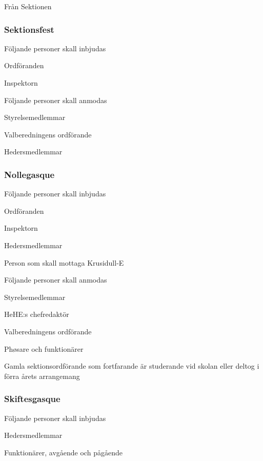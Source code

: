 \documentclass[10pt]{article}
\begin{document}
Från Sektionen

\subsubsection*{Sektionsfest}
Följande personer skall inbjudas
\begin{dashlist}
\item Ordföranden
\item Inspektorn
\end{dashlist}
Följande personer skall anmodas
\begin{dashlist}
\item Styrelsemedlemmar
\item Valberedningens ordförande
\item Hedersmedlemmar
\end{dashlist}

\subsubsection*{Nollegasque}
Följande personer skall inbjudas
\begin{dashlist}
\item Ordföranden
\item Inspektorn
\item Hedersmedlemmar
\item Person som skall mottaga Krusidull-E
\end{dashlist}
Följande personer skall anmodas
\begin{dashlist}
\item Styrelsemedlemmar
\item HeHE:s chefredaktör
\item Valberedningens ordförande
\item Phøsare och funktionärer
\item Gamla sektionsordförande som fortfarande är studerande vid skolan
eller deltog i förra årets
arrangemang
\end{dashlist}

\subsubsection*{Skiftesgasque}
Följande personer skall inbjudas
\begin{dashlist}
\item Hedersmedlemmar
\item Funktionärer, avgående och pågående
\end{dashlist}
\end{document}
